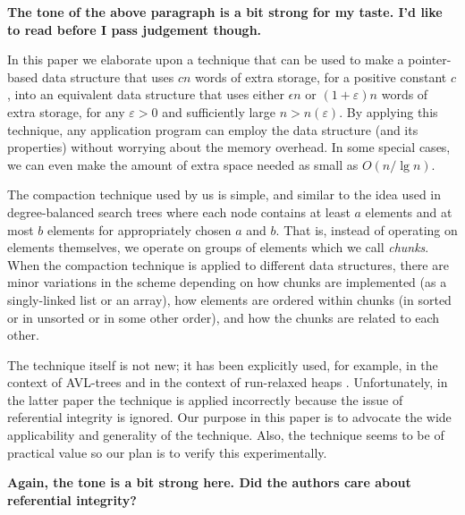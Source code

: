 \documentclass{DIKU-article}
\newcommand{\comment}[1]{}
\begin{document}
\noindent\textbf{The tone of the above paragraph is a bit strong for
my taste.  I'd like to read \cite{MP05} before I pass judgement
though.}

In this paper we elaborate upon a technique that can be used to make a
pointer-based data structure that uses $cn$ words of extra storage,
for a positive constant $c$, into an equivalent data structure that
uses either $\epsilon n$ or $(1 + \varepsilon) n$ words of extra
storage, for any $\varepsilon>0$ and sufficiently large $n >
n(\varepsilon)$.  By applying this technique, any application program
can employ the data structure (and its properties) without worrying
about the memory overhead. In some special cases, we can even make the
amount of extra space needed as small as $O(n/\lg n)$.

The compaction technique used by us is simple, and similar to the idea
used in degree-balanced search trees \cite{hm82} where each node
contains at least $a$ elements and at most $b$ elements for
appropriately chosen $a$ and $b$. That is, instead of operating on
elements themselves, we operate on groups of elements which we call
\emph{chunks}. \comment{Each chunk has a \emph{representative} and the
underlying data structure operates on these representatives. The
elements in a chunk determine an \emph{interval} of values.} When the
compaction technique is applied to different data structures, there
are minor variations in the scheme depending on how chunks are
implemented (as a singly-linked list or an array), how elements are
ordered within chunks (in sorted or in unsorted or in some other
order), and how the chunks are related to each other.

The technique itself is not new; it has been explicitly used, for
example, in the context of AVL-trees \cite{Mun86} and in the context
of run-relaxed heaps \cite{DGST88}. Unfortunately, in the latter paper
the technique is applied incorrectly because the issue of referential
integrity is ignored.  Our purpose in this paper is to advocate the
wide applicability and generality of the technique.  Also, the
technique seems to be of practical value so our plan is to verify this
experimentally.

\noindent\textbf{Again, the tone is a bit strong here.  Did the
authors care about referential integrity?}
\end{document}
